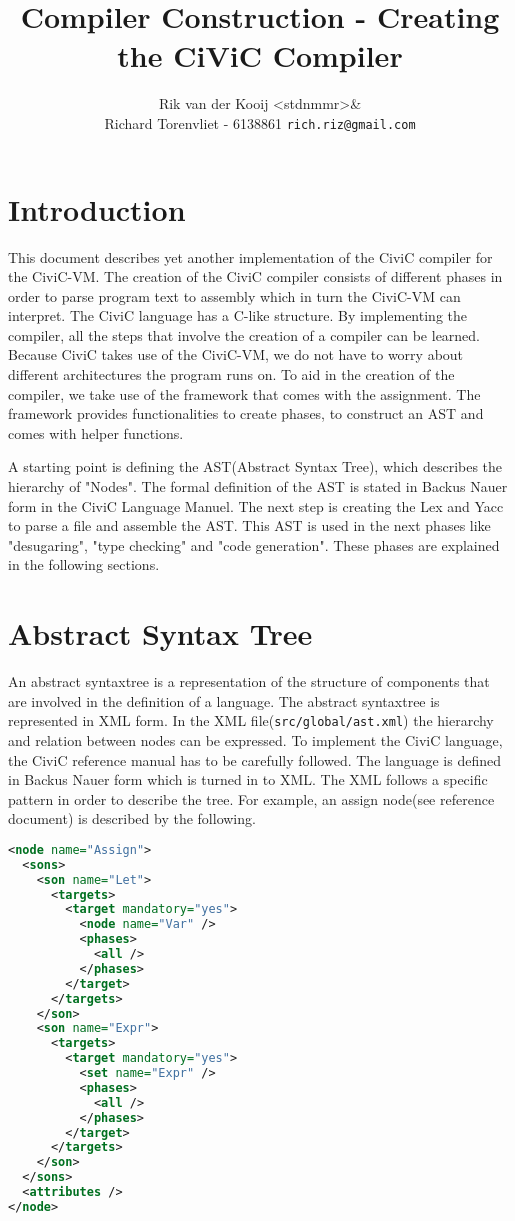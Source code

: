 \documentclass[a4paper]{article}
\author{Rik van der Kooij <stdnmmr>\& \\
Richard Torenvliet - 6138861 \texttt{rich.riz@gmail.com}}
\title{Compiler Construction - Creating the CiViC Compiler}
\begin{document}
\lstset{
    numbers=left,
    tabsize=2,
}


\tableofcontents
\maketitle
\section{Introduction}
This document describes yet another implementation of the CiviC compiler for
the CiviC-VM. The creation of the CiviC compiler consists of different phases
in order to parse program text to assembly which in turn the CiviC-VM can
interpret. The CiviC language has a C-like structure. By implementing the
compiler, all the steps that involve the creation of a compiler can be learned.
Because CiviC takes use of the CiviC-VM, we do not have to worry about
different architectures the program runs on. To aid in the creation of the
compiler, we take use of the framework that comes with the assignment. The framework provides
functionalities to create phases, to construct an AST and comes with helper
functions.

A starting point is defining the AST(Abstract Syntax Tree), which describes the
hierarchy of "Nodes". The formal definition of the AST is stated in Backus
Nauer form in the CiviC Language Manuel. The next step is creating the Lex and
Yacc to parse a file and assemble the AST. This AST is used in the next phases
like "desugaring", "type checking" and "code generation". These phases are
explained in the following sections.

\section{Abstract Syntax Tree}
An abstract syntaxtree is a representation of the structure of components that
are involved in the definition of a language.
The abstract syntaxtree is represented in XML form. In the XML
file(\texttt{src/global/ast.xml}) the hierarchy and relation between nodes can
be expressed. To implement the CiviC language, the CiviC reference manual has
to be carefully followed. The language is defined in Backus Nauer form which is
turned in to XML. The XML follows a specific pattern in order to describe the tree.
For example, an assign node(see reference document) is described by the
following.

\begin{lstlisting}[language=XML]
 <node name="Assign">
  <sons>
    <son name="Let">
      <targets>
        <target mandatory="yes">
          <node name="Var" />
          <phases>
            <all />
          </phases>
        </target>
      </targets>
    </son>
    <son name="Expr">
      <targets>
        <target mandatory="yes">
          <set name="Expr" />
          <phases>
            <all />
          </phases>
        </target>
      </targets>
    </son>
  </sons>
  <attributes />
</node>
\end{lstlisting}
\end{document}
